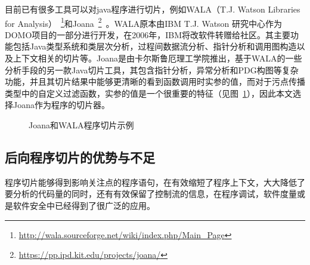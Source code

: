 目前已有很多工具可以对java程序进行切片，例如WALA（T.J. Watson Libraries for Analysis）~\footnote{\url{http://wala.sourceforge.net/wiki/index.php/Main_Page}}和Joana~\footnote{\url{https://pp.ipd.kit.edu/projects/joana/}}~\cite{slices:joana}。WALA原本由IBM T.J. Watson 研究中心作为DOMO项目的一部分进行开发，在2006年，IBM将改软件转赠给社区。其主要功能包括Java类型系统和类层次分析，过程间数据流分析、指针分析和调用图构造以及上下文相关的切片等。Joana是由卡尔斯鲁厄理工学院推出，基于WALA的一些分析手段的另一款Java切片工具，其包含指针分析，异常分析和PDG构图等复杂功能，并且其切片结果中能够更清晰的看到函数调用时实参的值，而对于污点传播类型中的自定义过滤函数，实参的值是一个很重要的特征（见图~\ref{fig:sliceresult}），因此本文选择Joana作为程序的切片器。\\
\begin{figure}
	\centering
	\caption{Joana和WALA程序切片示例}
	\label{fig:sliceresult} %
\end{figure}

\subsection{后向程序切片的优势与不足}
程序切片能够得到影响关注点的程序语句，在有效缩短了程序上下文，大大降低了要分析的代码量的同时，还有有效保留了控制流的信息，在程序调试，软件度量或是软件安全中已经得到了很广泛的应用。

